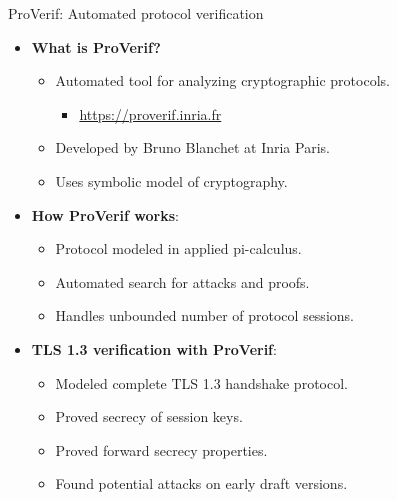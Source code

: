 \documentclass[aspectratio=169, lualatex, handout]{beamer}
\begin{document}
\begin{frame}{ProVerif: Automated protocol verification}
	\begin{itemize}
		\item \textbf{What is ProVerif?}
		      \begin{itemize}
			      \item Automated tool for analyzing cryptographic protocols.
			            \begin{itemize}
				            \item \url{https://proverif.inria.fr}
			            \end{itemize}
			      \item Developed by Bruno Blanchet at Inria Paris.
			      \item Uses symbolic model of cryptography.
		      \end{itemize}
		\item \textbf{How ProVerif works}:
		      \begin{itemize}
			      \item Protocol modeled in applied pi-calculus.
			      \item Automated search for attacks and proofs.
			      \item Handles unbounded number of protocol sessions.
		      \end{itemize}
		\item \textbf{TLS 1.3 verification with ProVerif}:
		      \begin{itemize}
			      \item Modeled complete TLS 1.3 handshake protocol.
			      \item Proved secrecy of session keys.
			      \item Proved forward secrecy properties.
			      \item Found potential attacks on early draft versions.
		      \end{itemize}
	\end{itemize}
\end{frame}
\end{document}
